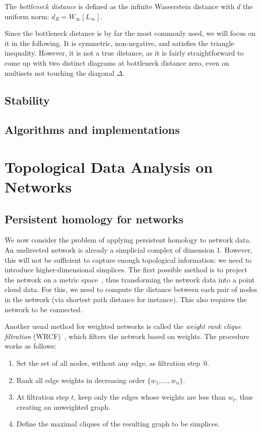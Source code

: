 \documentclass[a4paper,11pt,openany,extrafontsizes]{memoir}
\begin{document}
\begin{defn}
  The \emph{bottleneck distance} is defined as the infinite
  Wasserstein distance with $d$ the uniform norm:
  $d_B = W_\infty[L_\infty]$.
\end{defn}

Since the bottleneck distance is by far the most commonly used, we
will focus on it in the following. It is symmetric, non-negative, and
satisfies the triangle inequality. However, it is not a true distance,
as it is fairly straightforward to come up with two distinct diagrams
at bottleneck distance zero, even on multisets not touching the
diagonal $\Delta$.

\section{Stability}%
\label{sec:stability}

\section{Algorithms and implementations}%
\label{sec:algor-impl}


\chapter{Topological Data Analysis on Networks}%
\label{cha:topol-data-analys}

\section{Persistent homology for networks}%
\label{sec:pers-homol-netw}

We now consider the problem of applying persistent homology to network
data. An undirected network is already a simplicial complex of
dimension 1. However, this will not be sufficient to capture enough
topological information: we need to introduce higher-dimensional
simplices. The first possible method is to project the network on a
metric space~\cite{otter_roadmap_2017}, thus transforming the network
data into a point cloud data. For this, we need to compute the
distance between each pair of nodes in the network (via shortest path
distance for instance). This also requires the network to be
connected.

Another usual method for weighted networks is called the \emph{weight
  rank clique filtration} (WRCF)~\cite{petri_topological_2013}, which
filters the network based on weights. The procedure works as follows:
\begin{enumerate}
\item Set the set of all nodes, without any edge, as filtration
  step~0.
\item Rank all edge weights in decreasing order $\{w_1,\ldots,w_n\}$.
\item At filtration step $t$, keep only the edges whose weights are
  less than $w_t$, thus creating an unweighted graph.
\item Define the maximal cliques of the resulting graph to be
  simplices.
\end{enumerate}
\end{document}
